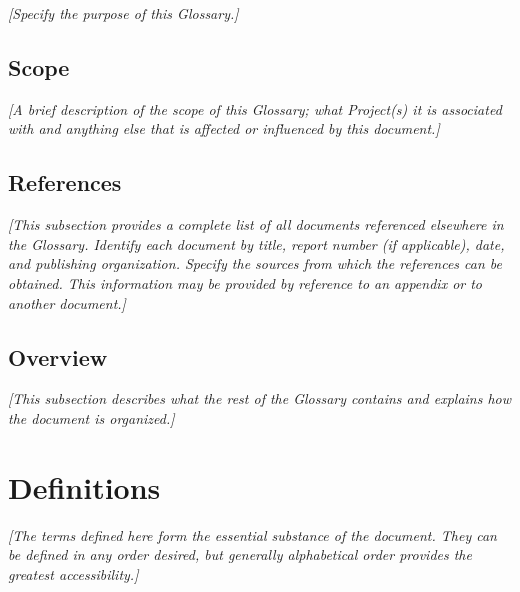 \documentclass[12pt, a4paper, titlepage]{article}
\begin{document}
\textit{{\color{blue}[Specify the purpose of this Glossary.]}}

\subsection{Scope}

\textit{{\color{blue}[A brief description of the scope of this Glossary; what Project(s) it is associated with and anything else that is affected or influenced by this document.]}}

\subsection{References}

\textit{{\color{blue}[This subsection provides a complete list of all documents referenced elsewhere in the Glossary. Identify each document by title, report number (if applicable), date, and publishing organization. Specify the sources from which the references can be obtained. This information may be provided by reference to an appendix or to another document.]}}

\subsection{Overview}

\textit{{\color{blue}[This subsection describes what the rest of the Glossary contains and explains how the document is organized.]}}

\section{Definitions}

\textit{{\color{blue}[The terms defined here form the essential substance of the document. They can be defined in any order desired, but generally alphabetical order provides the greatest accessibility.]}}

\end{document}
